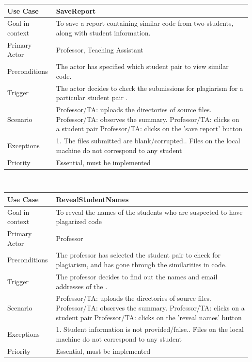 \documentclass[12pt]{article}
\begin{document}
\begin{tabular}{ |p{3cm}||p{11.25cm}| }
 \hline
 \textbf{Use Case} & \textbf{SaveReport}\\
 \hline
 Goal in context & To save a report containing similar code from two students, along with student information.\\
 \hline
 Primary Actor & Professor, Teaching Assistant \\
 \hline
 Preconditions& The actor has specified which student pair to view similar code.\\
 \hline
 Trigger &The actor decides to check the submissions for plagiarism for a particular student pair .\\
 \hline
 Scenario    &Professor/TA: uploads the directories of source files.\newline
Professor/TA: observes the summary.\newline
Professor/TA: clicks on a student pair\newline
Professor/TA: clicks on the 'save report' button \\
\hline
 Exceptions&  
1. The files submitted are blank/corrupted.\newline
2. Files on the local machine do not correspond to any student
\\
\hline
 Priority& Essential, must be implemented \\
 \hline
\end{tabular} \\[2.0 em]

\begin{tabular}{ |p{3cm}||p{11.25cm}| }
 \hline
 \textbf{Use Case} & \textbf{RevealStudentNames}\\
 \hline
 Goal in context & To reveal the names of the students who are suspected to have plagarized code\\
 \hline
 Primary Actor & Professor \\
 \hline
 Preconditions& The professor has selected the student pair to check for plagiarism, and has gone through the similarities in code.\\
 \hline
 Trigger &The professor decides to find out the names and email addresses of the  .\\
 \hline
 Scenario    &Professor/TA: uploads the directories of source files.\newline
Professor/TA: observes the summary.\newline
Professor/TA: clicks on a student pair\newline
Professor/TA: clicks on the 'reveal names' button \\
\hline
 Exceptions&  
1. Student information is not provided/false.\newline
2. Files on the local machine do not correspond to any student
\\
\hline
 Priority& Essential, must be implemented \\
 \hline
\end{tabular} \\[2.0 em]
\end{document}
